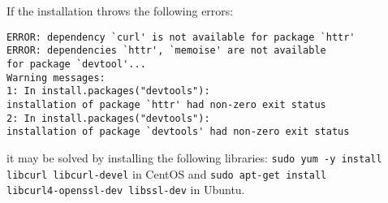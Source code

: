 If the installation throws the following errors:
\begin{verbatim}
ERROR: dependency `curl' is not available for package `httr'
ERROR: dependencies `httr', `memoise' are not available
for package `devtool'...
Warning messages:
1: In install.packages("devtools"):
installation of package `httr' had non-zero exit status
2: In install.packages("devtools"):
installation of package `devtools' had non-zero exit status
\end{verbatim}
it may be solved by installing the following libraries:  \verb|sudo yum -y install| \verb|libcurl libcurl-devel| in CentOS and \verb|sudo apt-get install| \\ \verb|libcurl4-openssl-dev libssl-dev| in Ubuntu.





